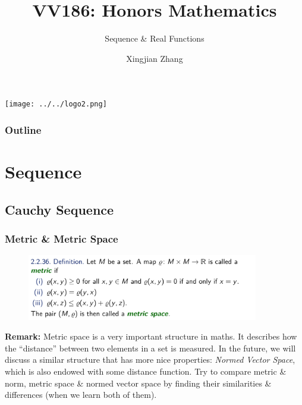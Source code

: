 \documentclass[10pt, t]{beamer}
\title{VV186: Honors Mathematics}
\subtitle{\large Sequence \& Real Functions}
\institute[UM-SJTU JI]{Univerity of Michigan-Shanghai Jiao Tong University Joint Institute}
\author{Xingjian Zhang}
\renewcommand{\emph}[1]{{\color{themecolor}\textsl{#1}}}
\begin{document}
\begin{frame}
    \titlepage
    \begin{center}
        \texttt{[image: ../../logo2.png]}
    \end{center}
\end{frame}

\begin{frame}
    \frametitle{Outline}
    \begin{spacing}{1}
        \tableofcontents
    \end{spacing}
\end{frame}

\section{Sequence}
\subsection{Cauchy Sequence}
\begin{frame}
    \frametitle{Metric \& Metric Space}
    \begin{figure}[H]
        \centering
        \includegraphics[width=0.9\textwidth]{2020-10-13-18-54-20.png}
    \end{figure}
    \textbf{Remark:} Metric space is a very important structure in maths. It describes how the ``distance'' between two elements in a set is measured. In the future, we will discuss a similar structure that has more nice properties: \emph{Normed Vector Space}, which is also endowed with some distance function. Try to compare metric \& norm, metric space \& normed vector space by finding their similarities \& differences (when we learn both of them).\\
\end{frame}
\end{document}
